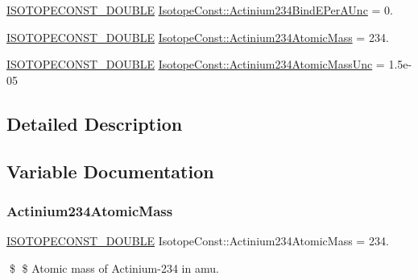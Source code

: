 \begin{DoxyCompactItemize}
\mbox{\hyperlink{group___isotope_const-_macros_ga8f45a7272ce02c0b4c65c44636ed719a}{I\+S\+O\+T\+O\+P\+E\+C\+O\+N\+S\+T\+\_\+\+D\+O\+U\+B\+LE}} \mbox{\hyperlink{group___isotope_const-_actinium-_ac234_gafb94545632aed4b83c67828ee1138429}{Isotope\+Const\+::\+Actinium234\+Bind\+E\+Per\+A\+Unc}} = 0.
\item 
\mbox{\hyperlink{group___isotope_const-_macros_ga8f45a7272ce02c0b4c65c44636ed719a}{I\+S\+O\+T\+O\+P\+E\+C\+O\+N\+S\+T\+\_\+\+D\+O\+U\+B\+LE}} \mbox{\hyperlink{group___isotope_const-_actinium-_ac234_ga0fa04bafa5f587211bae33eb1a9de862}{Isotope\+Const\+::\+Actinium234\+Atomic\+Mass}} = 234.
\item 
\mbox{\hyperlink{group___isotope_const-_macros_ga8f45a7272ce02c0b4c65c44636ed719a}{I\+S\+O\+T\+O\+P\+E\+C\+O\+N\+S\+T\+\_\+\+D\+O\+U\+B\+LE}} \mbox{\hyperlink{group___isotope_const-_actinium-_ac234_ga9c71c494ab67a96ca4848424354e8be5}{Isotope\+Const\+::\+Actinium234\+Atomic\+Mass\+Unc}} = 1.\+5e-\/05
\end{DoxyCompactItemize}


\subsection{Detailed Description}


\subsection{Variable Documentation}
\mbox{\label{group___isotope_const-_actinium-_ac234_ga0fa04bafa5f587211bae33eb1a9de862}} 
\subsubsection{\texorpdfstring{Actinium234\+Atomic\+Mass}{Actinium234AtomicMass}}
{\footnotesize\ttfamily \mbox{\hyperlink{group___isotope_const-_macros_ga8f45a7272ce02c0b4c65c44636ed719a}{I\+S\+O\+T\+O\+P\+E\+C\+O\+N\+S\+T\+\_\+\+D\+O\+U\+B\+LE}} Isotope\+Const\+::\+Actinium234\+Atomic\+Mass = 234.}

\$ \$ Atomic mass of Actinium-\/234 in amu. \mbox{\label{group___isotope_const-_actinium-_ac234_ga9c71c494ab67a96ca4848424354e8be5}} 
